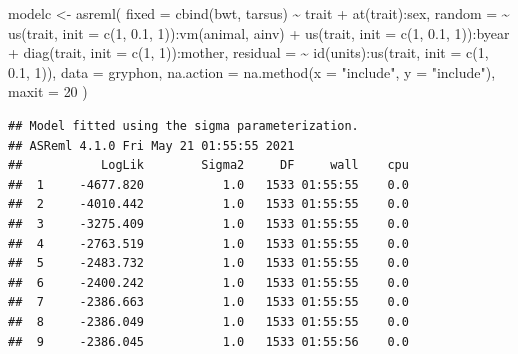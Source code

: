 \documentclass[
  12pt,
]{book}
\newenvironment{Shaded}{\begin{snugshade}}{\end{snugshade}}
\newcommand{\AttributeTok}[1]{\textcolor[rgb]{0.77,0.63,0.00}{#1}}
\newcommand{\DecValTok}[1]{\textcolor[rgb]{0.00,0.00,0.81}{#1}}
\newcommand{\FloatTok}[1]{\textcolor[rgb]{0.00,0.00,0.81}{#1}}
\newcommand{\FunctionTok}[1]{\textcolor[rgb]{0.00,0.00,0.00}{#1}}
\newcommand{\NormalTok}[1]{#1}
\newcommand{\OtherTok}[1]{\textcolor[rgb]{0.56,0.35,0.01}{#1}}
\newcommand{\SpecialCharTok}[1]{\textcolor[rgb]{0.00,0.00,0.00}{#1}}
\newcommand{\StringTok}[1]{\textcolor[rgb]{0.31,0.60,0.02}{#1}}
\begin{document}
\begin{Shaded}
\begin{Highlighting}[]
\NormalTok{modelc }\OtherTok{\textless{}{-}} \FunctionTok{asreml}\NormalTok{(}
  \AttributeTok{fixed =} \FunctionTok{cbind}\NormalTok{(bwt, tarsus) }\SpecialCharTok{\textasciitilde{}}\NormalTok{ trait }\SpecialCharTok{+} \FunctionTok{at}\NormalTok{(trait)}\SpecialCharTok{:}\NormalTok{sex,}
  \AttributeTok{random =} \SpecialCharTok{\textasciitilde{}} \FunctionTok{us}\NormalTok{(trait, }\AttributeTok{init =} \FunctionTok{c}\NormalTok{(}\DecValTok{1}\NormalTok{, }\FloatTok{0.1}\NormalTok{, }\DecValTok{1}\NormalTok{))}\SpecialCharTok{:}\FunctionTok{vm}\NormalTok{(animal, ainv) }\SpecialCharTok{+}
    \FunctionTok{us}\NormalTok{(trait, }\AttributeTok{init =} \FunctionTok{c}\NormalTok{(}\DecValTok{1}\NormalTok{, }\FloatTok{0.1}\NormalTok{, }\DecValTok{1}\NormalTok{))}\SpecialCharTok{:}\NormalTok{byear }\SpecialCharTok{+}
    \FunctionTok{diag}\NormalTok{(trait, }\AttributeTok{init =} \FunctionTok{c}\NormalTok{(}\DecValTok{1}\NormalTok{, }\DecValTok{1}\NormalTok{))}\SpecialCharTok{:}\NormalTok{mother,}
  \AttributeTok{residual =} \SpecialCharTok{\textasciitilde{}} \FunctionTok{id}\NormalTok{(units)}\SpecialCharTok{:}\FunctionTok{us}\NormalTok{(trait, }\AttributeTok{init =} \FunctionTok{c}\NormalTok{(}\DecValTok{1}\NormalTok{, }\FloatTok{0.1}\NormalTok{, }\DecValTok{1}\NormalTok{)),}
  \AttributeTok{data =}\NormalTok{ gryphon,}
  \AttributeTok{na.action =} \FunctionTok{na.method}\NormalTok{(}\AttributeTok{x =} \StringTok{"include"}\NormalTok{, }\AttributeTok{y =} \StringTok{"include"}\NormalTok{),}
  \AttributeTok{maxit =} \DecValTok{20}
\NormalTok{)}
\end{Highlighting}
\end{Shaded}

\begin{verbatim}
## Model fitted using the sigma parameterization.
## ASReml 4.1.0 Fri May 21 01:55:55 2021
##           LogLik        Sigma2     DF     wall    cpu
##  1     -4677.820           1.0   1533 01:55:55    0.0
##  2     -4010.442           1.0   1533 01:55:55    0.0
##  3     -3275.409           1.0   1533 01:55:55    0.0
##  4     -2763.519           1.0   1533 01:55:55    0.0
##  5     -2483.732           1.0   1533 01:55:55    0.0
##  6     -2400.242           1.0   1533 01:55:55    0.0
##  7     -2386.663           1.0   1533 01:55:55    0.0
##  8     -2386.049           1.0   1533 01:55:55    0.0
##  9     -2386.045           1.0   1533 01:55:56    0.0
\end{verbatim}
\end{document}
